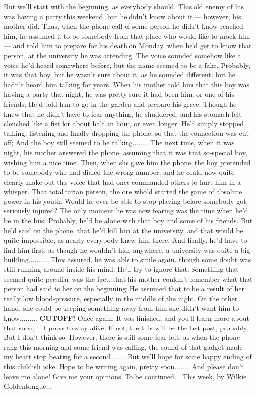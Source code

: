 But we'll start with the beginning, as everybody should. 
This old enemy of his was having a party this weekend, but he didn't know about it --- however, his mother did. Thus, when the phone call of some person he didn't know reached him, he assumed it to be somebody from that place who would like to mock him --- and told him to prepare for his death on Monday, when he'd get to know that person, at the university he was attending. The voice sounded somehow like a voice he'd heard somewhere before, but the name seemed to be a fake. Probably, it was that boy, but he wasn't sure about it, as he sounded different; but he hadn't heard him talking for years. When his mother told him that this boy was having a party that night, he was pretty sure it had been him, or one of his friends; He'd told him to go in the garden and prepare his grave. 
Though he knew that he didn't have to fear anything, he shuddered, and his stomach felt clenched like a fist for about half an hour, or even longer. 
He'd simply stopped talking, listening and finally dropping the phone, so that the connection was cut off; And the boy still seemed to be talking........
The next time, when it was night, his mother answered the phone, assuming that it was that so-special boy, wishing him a nice time. Then, when she gave him the phone, the boy pretended to be somebody who had dialed the wrong number, and he could now quite clearly make out this voice that had once commanded others to hurt him in a whisper. 
That totalitarian person, the one who'd started the game of absolute power in his youth. Would he ever be able to stop playing before somebody got seriously injured?
The only moment he was now fearing was the time when he'd be in the bus; Probably, he'd be alone with that boy and some of his friends. 
But he'd said on the phone, that he'd kill him at the university, and that would be quite impossible, as nearly everybody knew him there. And finally, he'd have to find him first, as though he wouldn't hide anywhere, a university was quite a big building..........
Thus assured, he was able to smile again, though some doubt was still running around inside his mind. 
He'd try to ignore that. 
Something that seemed quite peculiar was the fact, that his mother couldn't remember what that person had said to her on the beginning; He assumed that to be a result of her really low blood-pressure, especially in the middle of the night. On the other hand, she could be keeping something away from him she didn't want him to know.........
\textbf{CUTOFF!}
Once again. 
It was finished, and you'll learn more about that soon, if I prove to stay alive. If not, the this will be the last post, probably; But I don't think so. 
However, there is still some fear left, as when the phone rang this morning and some friend was calling, the sound of that gadget made my heart stop beating for a second........
But we'll hope for some happy ending of this childish joke. 
Hope to be writing again, pretty soon........
And please don't leave me alone!
Give me your opinions!
To be continued...
This week, by Wilkie Goldentongue...

